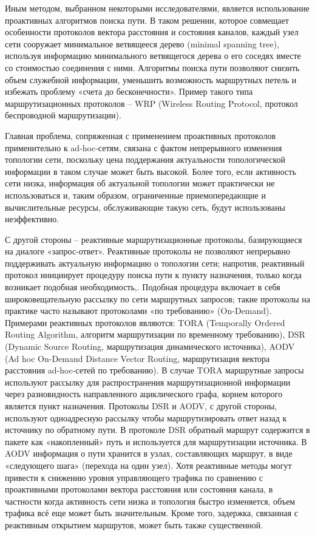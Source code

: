 \documentclass[14pt,a4paper,titlepage]{extarticle}
\begin{document}
Иным методом, выбранном некоторыми исследователями, является использование проактивных алгоритмов поиска пути. В таком решении, которое совмещает особенности протоколов вектора расстояния и состояния каналов, каждый узел сети сооружает минимальное ветвящееся дерево (minimal spanning tree), используя информацию минимального ветвящегося дерева о его соседях вместе со стоимостью соединения с ними. Алгоритмы поиска пути позволяют снизить объем служебной информации, уменьшить возможность маршрутных петель и избежать проблему «счета до бесконечности». Пример такого типа маршрутизационных протоколов -- WRP (Wireless Routing Protocol, протокол беспроводной маршрутизации).
 
Главная проблема, сопряженная с применением проактивных протоколов применительно к ad-hoc-сетям, связана с фактом непрерывного изменения топологии сети, поскольку цена поддержания актуальности топологической информации в таком случае может быть высокой. Более того, если активность сети низка, информация об актуальной топологии может практически не использоваться и, таким образом, ограниченные приемопередающие и вычислительные ресурсы, обслуживающие такую сеть, будут использованы неэффективно. 

С другой стороны -- реактивные маршрутизационные протоколы, базирующиеся на диалоге «запрос-ответ». Реактивные протоколы не позволяют непрерывно поддерживать актуальную информацию о топологии сети; напротив, реактивный протокол инициирует процедуру поиска пути к пункту назначения, только когда возникает подобная необходимость,. Подобная процедура включает в себя широковещательную рассылку по сети маршрутных запросов; такие протоколы на практике часто называют протоколами «по требованию» (On-Demand). Примерами реактивных протоколов являются: TORA (Temporally Ordered Routing Algorithm, алгоритм маршрутизации по временному требованию), DSR (Dynamic Source Routing, маршрутизация динамического источника), AODV (Ad hoc On-Demand Distance Vector Routing, маршрутизация вектора расстояния ad-hoc-сетей по требованию). В случае TORA маршрутные запросы используют рассылку для распространения маршрутизационной информации через разновидность направленного ациклического графа, корнем которого является пункт назначения. Протоколы DSR и AODV, с другой стороны, используют одноадресную рассылку чтобы маршрутизировать ответ назад к источнику по обратному пути. В протоколе DSR обратный маршрут содержится в пакете как «накопленный» путь и используется для маршрутизации источника. В AODV информация о пути хранится в узлах, составляющих маршрут, в виде «следующего шага» (перехода на один узел). Хотя реактивные методы могут привести к снижению уровня управляющего трафика по сравнению с проактивными протоколами вектора расстояния или состояния канала, в частности когда активность сети низка и топология быстро изменяется, объем трафика всё еще может быть значительным. Кроме того, задержка, связанная с реактивным открытием маршрутов, может быть также существенной.
\end{document}
